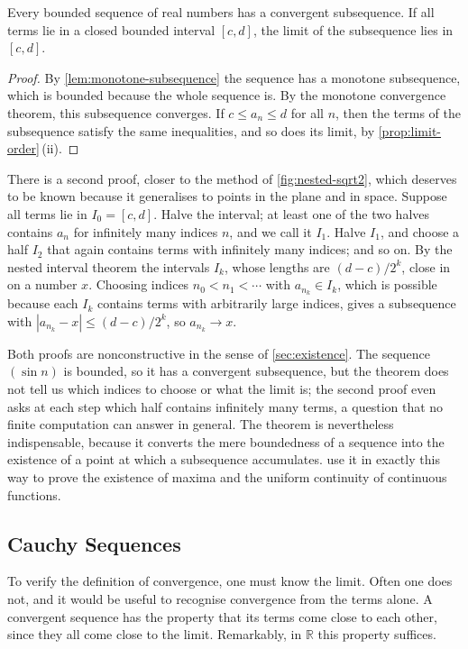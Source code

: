 \begin{theorem}
\label{thm:bolzano-weierstrass}
Every bounded sequence of real numbers has a convergent subsequence. If all terms lie in a closed bounded interval $[c,d]$, the limit of the subsequence lies in $[c,d]$.
\end{theorem}

\begin{proof}
By \cref{lem:monotone-subsequence} the sequence has a monotone subsequence, which is bounded because the whole sequence is. By the monotone convergence theorem, this subsequence converges. If $c\le a_n\le d$ for all $n$, then the terms of the subsequence satisfy the same inequalities, and so does its limit, by \cref{prop:limit-order}\,(ii).
\end{proof}

There is a second proof, closer to the method of \cref{fig:nested-sqrt2}, which deserves to be known because it generalises to points in the plane and in space. Suppose all terms lie in $I_0=[c,d]$. Halve the interval; at least one of the two halves contains $a_n$ for infinitely many indices $n$, and we call it $I_1$. Halve $I_1$, and choose a half $I_2$ that again contains terms with infinitely many indices; and so on. By the nested interval theorem the intervals $I_k$, whose lengths are $(d-c)/2^k$, close in on a number $x$. Choosing indices $n_0<n_1<\cdots$ with $a_{n_k}\in I_k$, which is possible because each $I_k$ contains terms with arbitrarily large indices, gives a subsequence with $|a_{n_k}-x|\le(d-c)/2^k$, so $a_{n_k}\to x$.

Both proofs are nonconstructive in the sense of \cref{sec:existence}. The sequence $(\sin n)$ is bounded, so it has a convergent subsequence, but the theorem does not tell us which indices to choose or what the limit is; the second proof even asks at each step which half contains infinitely many terms, a question that no finite computation can answer in general. The theorem is nevertheless indispensable, because it converts the mere boundedness of a sequence into the existence of a point at which a subsequence accumulates.  use it in exactly this way to prove the existence of maxima and the uniform continuity of continuous functions.

\subsection{Cauchy Sequences}

To verify the definition of convergence, one must know the limit. Often one does not, and it would be useful to recognise convergence from the terms alone. A convergent sequence has the property that its terms come close to each other, since they all come close to the limit. Remarkably, in $\mathbb R$ this property suffices.

